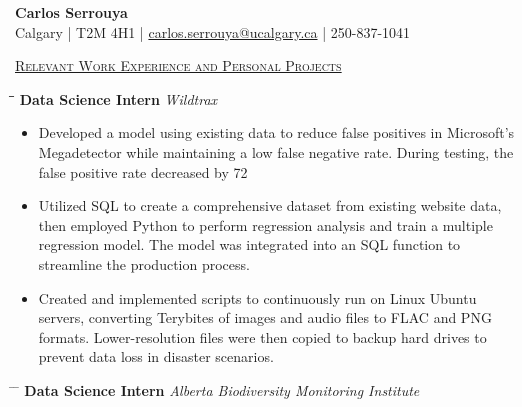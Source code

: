 \documentclass[a4paper,11pt]{article}
\def\jobh{\hspace{0cm}}
\def\locationh{\hspace{7cm}}
\def\dateh{\hspace{10cm}}
\def\titlev{\vspace{0cm}}
\def\sectionv{\vspace{0cm}}
\def\subsectionv{\vspace{-5ex}}
\def\postpointsv{\vspace{0cm}}
\begin{document}
\begin{center}
    {\LARGE \textbf{Carlos Serrouya}} \\
    Calgary | T2M 4H1 | \href{mailto:carlos.serrouya@ucalgary.ca}{carlos.serrouya@ucalgary.ca} | 250-837-1041 \\
\end{center}

\titlev

\uline{\textsc{Relevant Work Experience and Personal Projects}\hfill}

\sectionv

\begin{tabbing}
    \jobh \= \locationh \= \dateh \= \kill
    \textbf{Data Science Intern} \> \textit{Wildtrax} \\
\end{tabbing}

\begin{itemize}[leftmargin=0.0cm, itemsep=.1cm, before=\subsectionv, after=\postpointsv]
	\item Developed a model using existing data to reduce false positives in Microsoft's Megadetector while maintaining a low false negative rate. During testing, the false positive rate decreased by 72%
	\item Utilized SQL to create a comprehensive dataset from existing website data, then employed Python to perform regression analysis and train a multiple regression model. The model was integrated into an SQL function to streamline the production process.
	\item Created and implemented scripts to continuously run on Linux Ubuntu servers, converting Terybites of images and audio files to FLAC and PNG formats. Lower-resolution files were then copied to backup hard drives to prevent data loss in disaster scenarios.
\end{itemize}

\vspace{0.5cm}

\begin{tabbing}
    \hspace{7cm} \= \hspace{10cm} \= \kill
    \textbf{Data Science Intern} \> \textit{Alberta Biodiversity Monitoring Institute} \\
\end{tabbing}
\end{document}
